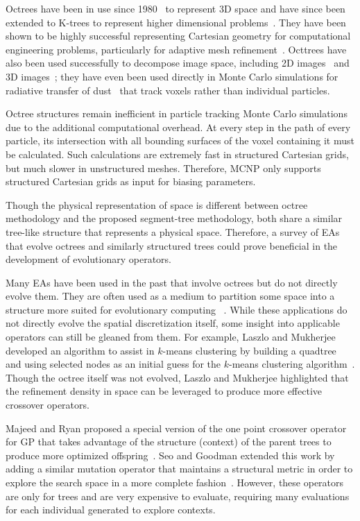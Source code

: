 \documentclass{article}
\begin{document}
Octrees have been in use since 1980~\cite{ref:jackins1980249} to represent 3D space and have since been extended to K-trees to represent higher dimensional problems~\cite{ref:jackins1983533}. They have been shown to be highly successful representing Cartesian geometry for computational engineering problems, particularly for adaptive mesh refinement~\cite{ref:Linden201558}. Octtrees have also been used successfully to decompose image space, including 2D images~\cite{ref:Lange2004592} and 3D images~\cite{ref:udomchaiporn2013229, ref:Lee2010359}; they have even been used directly in Monte Carlo simulations for radiative transfer of dust~\cite{ref:Saftly2013} that track voxels rather than individual particles.

Octree structures remain inefficient in particle tracking Monte Carlo simulations due to the additional computational overhead. At every step in the path of every particle, its intersection with all bounding surfaces of the voxel containing it must be calculated. Such calculations are extremely fast in structured Cartesian grids, but much slower in unstructured meshes. Therefore, MCNP only supports structured Cartesian grids as input for biasing parameters.

Though the physical representation of space is different between octree methodology and the proposed segment-tree methodology, both share a similar tree-like structure that represents a physical space. Therefore, a survey of EAs that evolve octrees and similarly structured trees could prove beneficial in the development of evolutionary operators.

Many EAs have been used in the past that involve octrees but do not directly evolve them. They are often used as a medium to partition some space into a structure more suited for evolutionary computing ~\cite{ref:Zhu2015301, ref:Schwertfeger200853}. While these applications do not directly evolve the spatial discretization itself, some insight into applicable operators can still be gleaned from them. For example, Laszlo and Mukherjee developed an algorithm to assist in $k$-means clustering by building a quadtree and using selected nodes as an initial guess for the $k$-means clustering algorithm~\cite{ref:Laszlo2006}. Though the octree itself was not evolved, Laszlo and Mukherjee highlighted that the refinement density in space can be leveraged to produce more effective crossover operators.

Majeed and Ryan proposed a special version of the one point crossover operator for GP that takes advantage of the structure (context) of the parent trees to produce more optimized offspring~\cite{ref:Majeed2007}. Seo and Goodman extended this work by adding a similar mutation operator that maintains a structural metric in order to explore the search space in a more complete fashion~\cite{ref:seo2009}. However, these operators are only for trees and are very expensive to evaluate, requiring many evaluations for each individual generated to explore contexts.
\end{document}
